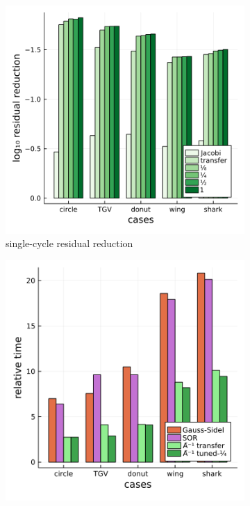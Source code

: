 \documentclass[review]{elsarticle}
\begin{document}
\begin{figure}
    \centering
    \begin{subfigure}[b]{0.47\textwidth}
        \centering
        \includegraphics[width=\textwidth]{figures/scaleloss.png}
        \caption{single-cycle residual reduction}
        \label{fig:scaled loss}
    \end{subfigure}
    \hfill
    \begin{subfigure}[b]{0.47\textwidth}
        \centering
        \includegraphics[width=\textwidth]{figures/crosscount.png}

\end{subfigure}
\end{figure}
\end{document}
